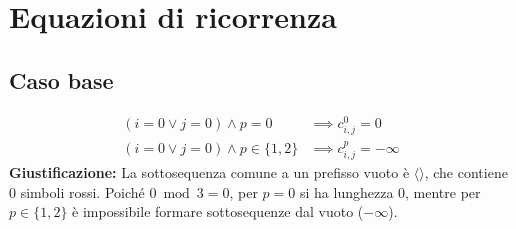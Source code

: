 \section{Equazioni di ricorrenza}

\subsection{Caso base}
\begin{align*}
    (i = 0 \lor j = 0) \land p = 0 &\implies c_{i,j}^0 = 0 \\
    (i = 0 \lor j = 0) \land p \in \{1, 2\} &\implies c_{i,j}^p = -\infty
\end{align*}
\textbf{Giustificazione:} La sottosequenza comune a un prefisso vuoto è $\langle \rangle$, che contiene $0$ simboli rossi. Poiché $0 \bmod 3 = 0$, per $p = 0$ si ha lunghezza $0$, mentre per $p \in \{1, 2\}$ è impossibile formare sottosequenze dal vuoto ($-\infty$).

